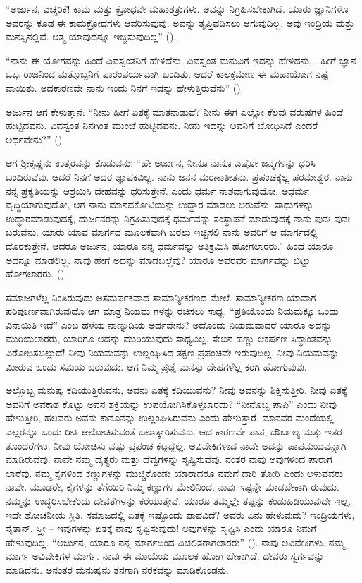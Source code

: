 “ಅರ್ಜುನ, ಎಚ್ಚರಿಕೆ! ಕಾಮ ಮತ್ತು ಕ್ರೋಧವೇ ಮಹಾಶತ್ರುಗಳು. ಅವನ್ನು ನಿಗ್ರಹಿಸಬೇಕಾಗಿದೆ. ಯಾರು ಜ್ಞಾನಿಗಳೊ ಅವರನ್ನು ಕೂಡ ಈ ಕಾಮಕ್ರೋಧಗಳು ಆವರಿಸುವುವು. ಅವನ್ನು ತೃಪ್ತಿಪಡಿಸಲು ಆಗುವುದಿಲ್ಲ. ಅವು ಇಂದ್ರಿಯ ಮತ್ತು ಮನಸ್ಸಿನಲ್ಲಿವೆ. ಆತ್ಮ ಯಾವುದನ್ನೂ ಇಚ್ಚಿಸುವುದಿಲ್ಲ” ().

“ನಾನು ಈ ಯೋಗವನ್ನು ಹಿಂದೆ ವಿವಸ್ವಂತನಿಗೆ ಹೇಳಿದೆನು. ವಿವಸ್ವಂತ ಮನುವಿಗೆ ಇದನ್ನು ಹೇಳಿದನು... ಹೀಗೆ ಜ್ಞಾನ ಒಬ್ಬ ರಾಜನಿಂದ ಮತ್ತೊಬ್ಬನಿಗೆ ಪಾರಂಪರ್ಯವಾಗಿ ಬಂದಿತು. ಆದರೆ ಕಾಲಕ್ರಮೇಣ ಈ ಮಹಾಯೋಗ ನಷ್ಟ ವಾಯಿತು. ಅದಕಾರಣವೇ ನಾನು ಇಂದು ನಿನಗೆ ಇದನ್ನು ಹೇಳುತ್ತಿರುವೆನು” ().

ಅರ್ಜುನ ಆಗ ಕೇಳುತ್ತಾನೆ: “ನೀನು ಹೀಗೆ ಏತಕ್ಕೆ ಮಾತನಾಡುವೆ? ನೀನು ಈಗ ಎಲ್ಲೋ ಕೆಲವು ವರುಷಗಳ ಹಿಂದೆ ಹುಟ್ಟಿದವನು. ವಿವಸ್ವಂತ ನಿನಗಿಂತ ಮುಂಚೆ ಹುಟ್ಟಿದವನು. ನೀನು ಇದನ್ನು ಅವನಿಗೆ ಬೋಧಿಸಿದೆ ಎಂದರೆ ಅರ್ಥವೇನು?” ()

ಆಗ ಶ‍್ರೀಕೃಷ್ಣನು ಉತ್ತರವನ್ನು ಕೊಡುವನು: “ಹೇ ಅರ್ಜುನ, ನೀನೂ ನಾನೂ ಎಷ್ಟೋ ಜನ್ಮಗಳನ್ನು ಧರಿಸಿ ಬಂದಿರುವೆವು. ಆದರೆ ನಿನಗೆ ಅದರ ಜ್ಞಾಪಕವಿಲ್ಲ. ನಾನು ಜನನ ಮರಣಾತೀತನು. ಪ್ರಪಂಚಕ್ಕೆಲ್ಲ ಪರಮೇಶ್ವರ. ನಾನು ನನ್ನ ಪ್ರಕೃತಿಯನ್ನು ಆಶ್ರಯಿಸಿ ದೇಹವನ್ನು ಧರಿಸುತ್ತೇನೆ. ಎಂದು ಧರ್ಮ ನಾಶವಾಗುವುದೋ, ಅಧರ್ಮ ವೃದ್ಧಿಯಾಗುವುದೋ, ಆಗ ನಾನು ಮಾನವಕೋಟಿಯನ್ನು ಉದ್ಧಾರ ಮಾಡಲು ಬರುವೆನು. ಸಾಧುಗಳನ್ನು ಉದ್ಧಾರಮಾಡುವುದಕ್ಕೆ, ದುರ್ಜನರನ್ನು ನಿಗ್ರಹಿಸುವುದಕ್ಕೆ ಧರ್ಮವನ್ನು ಸಂಸ್ಥಾಪನೆ ಮಾಡುವುದಕ್ಕೆ ನಾನು ಪುನಃ ಪುನಃ ಬರುವೆನು. ಯಾರು ಯಾವ ಮಾರ್ಗದ ಮೂಲಕವಾಗಿ ಬರಲು ಇಚ್ಛಿಸಲಿ ನಾನು ಅವರಿಗೆ ಆ ಮಾರ್ಗದಲ್ಲಿ ದೊರಕುತ್ತೇನೆ. ಆದರೂ ಅರ್ಜುನ, ಯಾರೂ ನನ್ನ ಧರ್ಮವನ್ನು ಅತಿಕ್ರಮಿಸಿ ಹೋಗಲಾರರು.” ಹಿಂದೆ ಯಾರೂ ಅದನ್ನೂ ಮಾಡಲಿಲ್ಲ. ನಾವು ಹೇಗೆ ಅದನ್ನು ಮಾಡಬಲ್ಲೆವು? ಯಾರೂ ಅವರವರ ಮಾರ್ಗವನ್ನು ಬಿಟ್ಟು ಹೋಗಲಾರರು. ()

ಸಮಾಜಗಳೆಲ್ಲ ನಿಂತಿರುವುದು ಅಸಮರ್ಪಕವಾದ ಸಾಮಾನ್ಯೀಕರಣದ ಮೇಲೆ. ಸಾಮಾನ್ಯೀಕರಣ ಯಾವಾಗ ಪರಿಪೂರ್ಣವಾಗಿರುವುದೊ ಆಗ ಮಾತ್ರ ನಿಯಮ ಗಳನ್ನು ರಚಿಸಲು ಸಾಧ್ಯ. “ಪ್ರತಿಯೊಂದು ನಿಯಮಕ್ಕೂ ಒಂದು ವಿನಾಯಿತಿ ಇದೆ” ಎಂಬ ಹಳೆಯ ನಾಣ್ನುಡಿಯ ಅರ್ಥವೇನು? ಅದೊಂದು ನಿಯಮವಾದರೆ ಯಾರೂ ಅದನ್ನು ಮುರಿಯಲಾರರು, ಯಾರಿಗೂ ಅದನ್ನು ಮುರಿಯುವುದು ಸಾಧ್ಯವಿಲ್ಲ. ಸೇಬಿನ ಹಣ್ಣು ಆಕರ್ಷಣ ಸಿದ್ಧಾಂತವನ್ನು ವಿರೋಧಿಸಬಲ್ಲುದೆ! ನೀವು ನಿಯಮವನ್ನು ಉಲ್ಲಂಘಿಸಿದ ತಕ್ಷಣ ಪ್ರಪಂಚವೇ ಇರುವುದಿಲ್ಲ. ನೀವು ನಿಯಮವನ್ನು ಮೀರುವ ಒಂದು ಸಮಯ ಬರುವುದು. ಆಗ ನಿಮ್ಮ ಪ್ರಜ್ಞೆ ಮನಸ್ಸು ದೇಹಗಳೆಲ್ಲ ಕರಗಿ ಹೋಗುವುವು.

ಅಲ್ಲೊಬ್ಬ ಮನುಷ್ಯ ಕದಿಯುತ್ತಿರುವನು, ಅವನು ಏತಕ್ಕೆ ಕದಿಯುವನು? ನೀವು ಅವನನ್ನು ಶಿಕ್ಷಿಸುತ್ತೀರಿ. ನೀವು ಏತಕ್ಕೆ ಅವನಿಗೆ ಅವಕಾಶ ಕೊಟ್ಟು ಅವನ ಶಕ್ತಿಯನ್ನು ಉಪಯೋಗಿಸಿಕೊಳ್ಳಬಾರದು? “ನೀನೊಬ್ಬ ಪಾಪಿ” ಎಂದು ನೀವು ಹೇಳುತ್ತೀರಿ, ಹಲವರು ಅವನು ಕಾನೂನನ್ನು ಉಲ್ಲಂಘಿಸಿರುವನು ಎಂದು ಹೇಳುತ್ತಾರೆ. ಮಾನವರ ಮಂದೆಯಲ್ಲಿ ಎಲ್ಲರನ್ನೂ ಒಂದು ರೀತಿ ಆಲೋಚಿಸುವಂತೆ ಬಲಾತ್ಕಾರಿಸುವನು. ಆದ ಕಾರಣವೇ ಪಾಪ, ದೌರ್ಬಲ್ಯ ಮತ್ತು ಇತರ ತೊಂದರೆಗಳು. ನೀವು ಯೋಚಿಸು ವಷ್ಟು ಪ್ರಪಂಚ ಕೆಟ್ಟದ್ದಲ್ಲ. ಅವಿವೇಕಿಗಳಾದ ನಾವೇ ಅದನ್ನು ಪಾಪಮಯವನ್ನಾಗಿ ಮಾಡಿರುವೆವು. ನಾವೇ ನಮ್ಮ ದೈತ್ಯರು ಮತ್ತು ದೆವ್ವಗಳನ್ನು ಸೃಷ್ಟಿಸುವೆವು. ನಂತರ ನಾವು ಅವುಗಳಿಂದ ಪಾರಾಗ ಲಾರೆವು. ನಮ್ಮ ಕೈಗಳಿಂದ ಕಣ್ಣುಗಳನ್ನು ಮುಚ್ಚಿಕೊಂಡು ಯಾರಾದರೂ ನಮಗೆ ದಾರಿ ತೋರಿ ಎಂದು ಅಳುವವರು ನಾವೇ. ಮೂಢರೇ, ಕೈಗಳನ್ನು ತೆಗೆಯಿರಿ ನಿಮ್ಮ ಕಣ್ಣುಗಳ ಮೇಲಿನಿಂದ. ನಾವು ಇಷ್ಟನ್ನೇ ಮಾಡಬೇಕಾಗಿ ರುವುದು. ನಮ್ಮನ್ನು ಉದ್ಧರಿಸಬೇಕೆಂದು ದೇವತೆಗಳನ್ನು ಕರೆಯುತ್ತೇವೆ. ಯಾರೂ ತಮ್ಮಲ್ಲೇ ತಪ್ಪನ್ನು ಕಂಡುಹಿಡಿಯುವುದೇ ಇಲ್ಲ. ಇದೇ ಶೋಚನೀಯ ಸ್ಥಿತಿ. ಸಮಾಜದಲ್ಲಿ ಏತಕ್ಕೆ ಇಷ್ಟೊಂದು ಪಾಪವಿದೆ? ಅವರು ಏನು ಹೇಳುವುದು? ಇಂದ್ರಿಯಗಳು, ಸೈತಾನ್​, ಸ್ತ್ರೀ – ಇವುಗಳನ್ನು ಏತಕ್ಕೆ ನಾವು ಸೃಷ್ಟಿಸುವುದು! ಅವುಗಳನ್ನು ಸೃಷ್ಟಿಸಿ ಎಂದು ಯಾರೂ ನಿಮಗೆ ಹೇಳುವುದಿಲ್ಲ. “ಅರ್ಜುನ, ಯಾರೂ ನನ್ನ ಮಾರ್ಗದಿಂದ ವಿಚಲಿತರಾಗಲಾರರು” (). ನಾವು ಅವಿವೇಕಿಗಳು. ನಮ್ಮ ಮಾರ್ಗ ಅವಿವೇಕಿಗಳ ಮಾರ್ಗ. ನಾವು ಈ ಮಾಯೆಯ ಮೂಲಕ ಹೋಗ ಬೇಕಾಗಿದೆ. ದೇವರು ಸ್ವರ್ಗವನ್ನು ಮಾಡಿದನು. ಅನಂತರ ಮನುಷ್ಯನು ತನಗಾಗಿ ನರಕವನ್ನು ಮಾಡಿಕೊಂಡನು.

